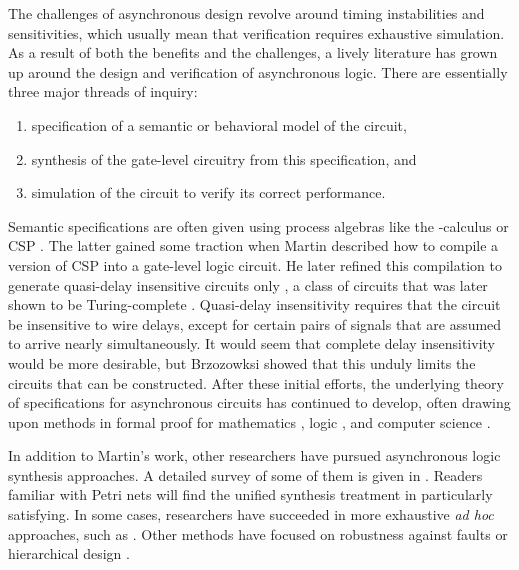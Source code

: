 \documentclass{amsart}
\theoremstyle{plain}
\theoremstyle{definition}
\begin{document}
The challenges of asynchronous design revolve around timing
instabilities and sensitivities, which usually mean that verification
requires exhaustive simulation.  As a result of both the benefits and
the challenges, a lively literature has grown up around the design and
verification of asynchronous logic.  There are essentially three major
threads of inquiry:
\begin{enumerate}
\item specification of a semantic or behavioral model of the circuit,
\item synthesis of the gate-level circuitry from this specification, and 
\item simulation of the circuit to verify its correct performance.
\end{enumerate}

Semantic specifications are often given using process algebras like
the -calculus \cite{Parrow} or CSP \cite{Hoare_2004}.  The latter
gained some traction when Martin \cite{Martin_1986} described how to
compile a version of CSP into a gate-level logic circuit.  He later
refined this compilation to generate quasi-delay insensitive circuits
only \cite{Martin_1990}, a class of circuits that was later shown to
be Turing-complete \cite{Manohar_1995}.  Quasi-delay insensitivity
requires that the circuit be insensitive to wire delays, except for
certain pairs of signals that are assumed to arrive nearly
simultaneously.  It would seem that complete delay insensitivity would
be more desirable, but Brzozowksi \cite{Brzozowksi_1992} showed that
this unduly limits the circuits that can be constructed.  After these
initial efforts, the underlying theory of specifications for
asynchronous circuits has continued to develop, often drawing upon
methods in formal proof for mathematics \cite{Harrison_2008}, logic
\cite{Vasyukevich_2009}, and computer science \cite{Dalrymple_2008}.

In addition to Martin's work, other researchers have pursued
asynchronous logic synthesis approaches.  A detailed survey of some of
them is given in \cite{Davis_1997}.  Readers familiar with Petri nets
will find the unified synthesis treatment in \cite{Cortadella}
particularly satisfying.  In some cases, researchers have succeeded in
more exhaustive {\it ad hoc} approaches, such as \cite{Cox_2000}.
Other methods have focused on robustness against faults
\cite{Monnet_2006} or hierarchical design \cite{Butucaru_2007}.
\end{document}
